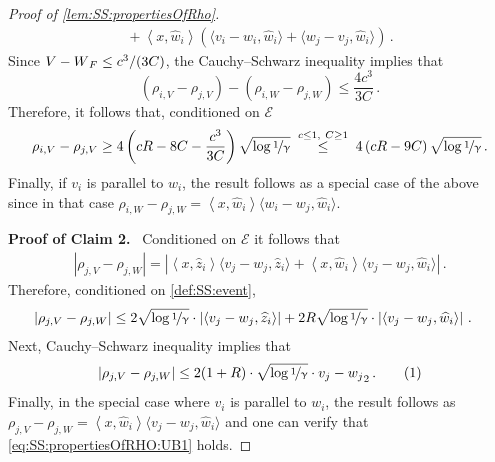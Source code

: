 \documentclass[11pt,letterpaper]{article}
\theoremstyle{plain}
\theoremstyle{definition}
\theoremstyle{remark}
\newcommand{\yesnum}{\addtocounter{equation}{1}\tag{\theequation}}
\newcommand{\Stackrel}[2]{\stackrel{\mathmakebox[\widthof{\ensuremath{#2}}]{#1}}{#2}}
\def\abs#1{\left| #1 \right|}
\newcommand{\sinangle}[1]{\ensuremath{\langle#1\rangle}}
\newcommand{\inparen}[1]{\ensuremath{\left(#1\right)}}
\newcommand{\inangle}[1]{\left\langle#1\right\rangle}
\let\norm\relax
\newcommand{\norm}[1]{\ensuremath{\left\lVert #1 \right\rVert}}
\newcommand{\evE}{\ensuremath{\mathscr{E}}}
\newcommand{\sfrac}[2]{{#1/#2}}
\newcommand{\nfrac}[2]{\nicefrac{#1}{#2}}
\newcommand{\wh}[1]{\widehat{#1}}
\renewcommand{\paragraph}[1]{\medskip \noindent\textbf{#1}~}
\renewcommand{\gamma}{\upgamma}
\begin{document}
{{{\begin{proof}[Proof of \cref{lem:SS:propertiesOfRho}]
\begin{align*}
{                    }
                    + \inangle{x,\wh{w}_i}
                    \inparen{
                        \sinangle{v_i - w_i, \wh{w}_i}
                        + \sinangle{w_j- v_j, \wh{w}_i}
                    }\,.
                \end{align*}
                Since $\norm{V-W}_F\leq \sfrac{c^3}{(3C)}$, the Cauchy--Schwarz inequality implies that
                \[
                    \inparen{\rho_{i,V} - \rho_{j,V}}
                    - \inparen{\rho_{i,W} - \rho_{j,W}}
                    \leq \frac{4c^3}{3C}\,.
                \]
                Therefore, it follows that, conditioned on $\evE$
                \[
                    \rho_{i,V} - \rho_{j,V} 
                    \geq 4\inparen{cR-8C-\frac{c^3}{3C}}\sqrt{\log{\nfrac{1}{\gamma}}}
                    ~~\quad \Stackrel{c\leq 1,~C\geq 1}{\leq}\quad~~ 
                    4\inparen{cR-9C}\sqrt{\log{\nfrac{1}{\gamma}}}\,.
                \]
                Finally, if $v_i$ is parallel to $w_i$, the result follows as a special case of the above since in that case $\rho_{i, W} - \rho_{j, W}
                    =
                    \inangle{x,\wh{w}_i}\sinangle{w_i - w_j, \wh{w}_i}$.

            \paragraph{Proof of Claim 2.}
                Conditioned on $\evE$ it follows that 
                \begin{align*}
                    \abs{\rho_{j,V} - \rho_{j,W}}
                    = \abs{
                        \inangle{x,\wh{z}_i}\sinangle{v_j - w_j, \wh{z}_i}
                        + 
                        \inangle{x,\wh{w}_i}\sinangle{v_j - w_j, \wh{w}_i}
                    }\,.
                \end{align*}
                Therefore, conditioned on \cref{def:SS:event}, 
                \begin{align*}
                    \abs{\rho_{j,V} - \rho_{j,W}} 
                    &\leq 2\sqrt{\log{\nfrac{1}{\gamma}}}\cdot \abs{\sinangle{v_j - w_j, \wh{z}_i}}
                    + 
                    2R\sqrt{\log{\nfrac{1}{\gamma}}}\cdot \abs{\sinangle{v_j - w_j, \wh{w}_i}}\,.
                \end{align*}
                Next, Cauchy--Schwarz inequality implies that 
                \[
                    \abs{\rho_{j,V} - \rho_{j,W}}  \leq 2(1+R)\cdot \sqrt{\log{\nfrac{1}{\gamma}}}\cdot \norm{v_j - w_j}_2\,.
                    \yesnum\label{eq:SS:propertiesOfRHO:UB1}
                \]
                Finally, in the special case where $v_i$ is parallel to $w_i$, the result follows as $\rho_{j,V} - \rho_{j,W}
                    = {
                        \inangle{x,\wh{w}_i}\sinangle{v_j - w_j, \wh{w}_i}
                    }$ and one can verify that \cref{eq:SS:propertiesOfRHO:UB1} holds.


\end{proof}}}}
\end{document}
